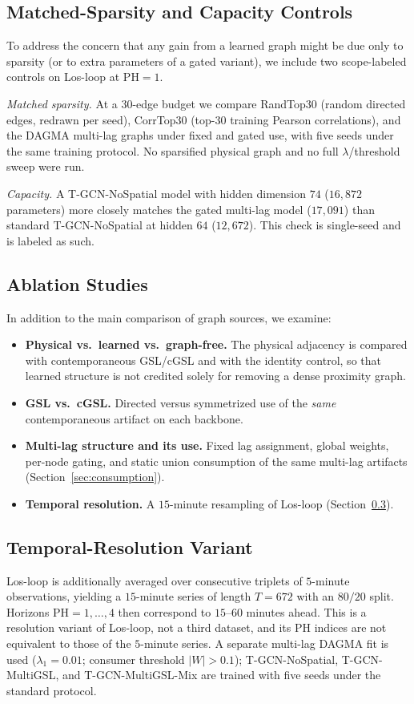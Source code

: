 \subsection{Matched-Sparsity and Capacity Controls}\label{sec:controls}

To address the concern that any gain from a learned graph might be due only
to sparsity (or to extra parameters of a gated variant), we include two
scope-labeled controls on Los-loop at $\mathrm{PH}=1$.

\emph{Matched sparsity.} At a $30$-edge budget we compare RandTop30 (random
directed edges, redrawn per seed), CorrTop30 (top-$30$ training Pearson
correlations), and the DAGMA multi-lag graphs under fixed and gated use,
with five seeds under the same training protocol. No sparsified physical
graph and no full $\lambda$/threshold sweep were run.

\emph{Capacity.} A T-GCN-NoSpatial model with hidden dimension $74$
($16{,}872$ parameters) more closely matches the gated multi-lag model
($17{,}091$) than standard T-GCN-NoSpatial at hidden $64$ ($12{,}672$). This
check is single-seed and is labeled as such.

\subsection{Ablation Studies}\label{sec:ablations}

In addition to the main comparison of graph sources, we examine:

\begin{itemize}
\item \textbf{Physical vs.\ learned vs.\ graph-free.} The physical adjacency
is compared with contemporaneous GSL/cGSL and with the identity control, so
that learned structure is not credited solely for removing a dense
proximity graph.
\item \textbf{GSL vs.\ cGSL.} Directed versus symmetrized use of the
\emph{same} contemporaneous artifact on each backbone.
\item \textbf{Multi-lag structure and its use.} Fixed lag assignment,
global weights, per-node gating, and static union consumption of the same
multi-lag artifacts (Section~\ref{sec:consumption}).
\item \textbf{Temporal resolution.} A $15$-minute resampling of Los-loop
(Section~\ref{sec:variant15}).
\end{itemize}

\subsection{Temporal-Resolution Variant}\label{sec:variant15}

Los-loop is additionally averaged over consecutive triplets of $5$-minute
observations, yielding a $15$-minute series of length $T=672$ with an
$80/20$ split. Horizons $\mathrm{PH}=1,\ldots,4$ then correspond to
$15$--$60$ minutes ahead. This is a resolution variant of Los-loop, not a
third dataset, and its PH indices are not equivalent to those of the
$5$-minute series. A separate multi-lag DAGMA fit is used
($\lambda_1=0.01$; consumer threshold $|W|>0.1$); T-GCN-NoSpatial,
T-GCN-MultiGSL, and T-GCN-MultiGSL-Mix are trained with five seeds under
the standard protocol.
